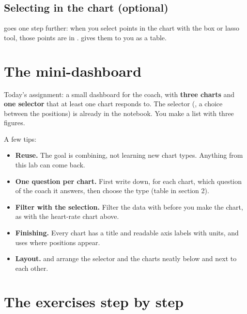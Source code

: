 \documentclass[11pt,a4paper]{article}
\begin{document}
\subsection{Selecting in the chart (optional)}

 goes one step further: when you select
points in the chart with the box or lasso tool, those points are in
.  gives them
to you as a table.

\section{The mini-dashboard}

Today's assignment: a small dashboard for the coach, with \textbf{three
charts} and \textbf{one selector} that at least one chart responds to.
The selector (, a choice between the
positions) is already in the notebook. You make a list
 with three figures.

A few tips:

\begin{itemize}
  \item \textbf{Reuse.} The goal is combining, not learning new chart
        types. Anything from this lab can come back.
  \item \textbf{One question per chart.} First write down, for each
        chart, which question of the coach it answers, then choose the
        type (table in section 2).
  \item \textbf{Filter with the selection.} Filter the data with
         before you make the chart, as
        with the heart-rate chart above.
  \item \textbf{Finishing.} Every chart has a title and readable axis
        labels with units, and uses  where
        positions appear.
  \item \textbf{Layout.}  and  arrange
        the selector and the charts neatly below and next to each other.
\end{itemize}

\section{The exercises step by step}
\end{document}
